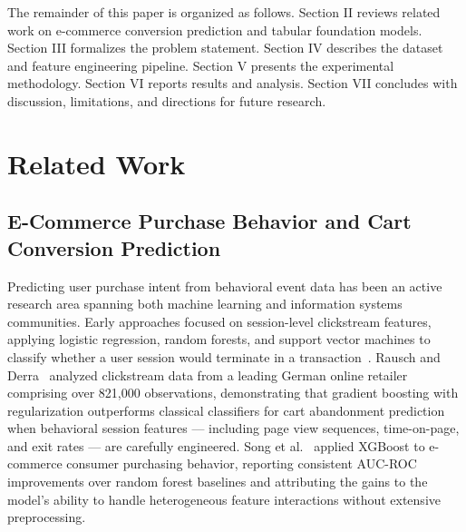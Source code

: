 \documentclass[conference]{IEEEtran}
\begin{document}
The remainder of this paper is organized as follows. Section II reviews related work on e-commerce conversion prediction and tabular foundation models. Section III formalizes the problem statement. Section IV describes the dataset and feature engineering pipeline. Section V presents the experimental methodology. Section VI reports results and analysis. Section VII concludes with discussion, limitations, and directions for future research.

\section{Related Work}

\subsection{E-Commerce Purchase Behavior and Cart Conversion Prediction}

Predicting user purchase intent from behavioral event data has been an
active research area spanning both machine learning and information
systems communities. Early approaches focused on session-level
clickstream features, applying logistic regression, random forests, and
support vector machines to classify whether a user session would
terminate in a transaction~\cite{sakar2019realtime}. Rausch and
Derra~\cite{rausch2021predicting} analyzed clickstream data from a
leading German online retailer comprising over 821,000 observations,
demonstrating that gradient boosting with regularization outperforms
classical classifiers for cart abandonment prediction when behavioral
session features --- including page view sequences, time-on-page, and
exit rates --- are carefully engineered. Song et
al.~\cite{song2020xgboost} applied XGBoost to e-commerce consumer
purchasing behavior, reporting consistent AUC-ROC improvements over
random forest baselines and attributing the gains to the model's ability
to handle heterogeneous feature interactions without extensive
preprocessing.
\end{document}
